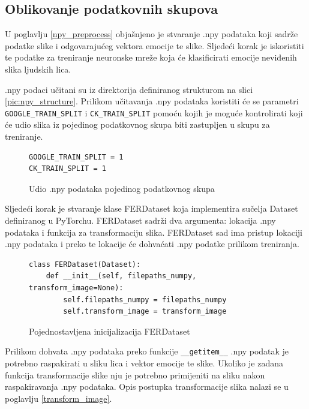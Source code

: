 \documentclass[times, utf8, zavrsni,numeric,pstricks]{fer}
\begin{document}
\subsection{Oblikovanje podatkovnih skupova}
U poglavlju \ref{npy_preprocess} objašnjeno je stvaranje .npy podataka koji sadrže podatke slike i odgovarajućeg vektora emocije te slike. Sljedeći korak je iskoristiti te podatke za treniranje neuronske mreže koja će klasificirati emocije neviđenih slika ljudskih lica.

.npy podaci učitani su iz direktorija definiranog strukturom na slici \ref{pic:npy_structure}. Prilikom učitavanja .npy podataka koristiti će se parametri \lstinline"GOOGLE_TRAIN_SPLIT" i \lstinline"CK_TRAIN_SPLIT" pomoću kojih je moguće kontrolirati koji će udio slika iz pojedinog podatkovnog skupa biti zastupljen u skupu za treniranje.

\begin{figure}[H]
\centering
\begin{Verbatim}[fontsize=\small]
GOOGLE_TRAIN_SPLIT = 1
CK_TRAIN_SPLIT = 1
\end{Verbatim}
\caption{Udio .npy podataka pojedinog podatkovnog skupa}
\label{pic:split_dataset}
\end{figure}
\noindent
Sljedeći korak je stvaranje klase FERDataset  koja implementira sučelja Dataset definiranog u PyTorchu. FERDataset sadrži dva argumenta: lokacija .npy podataka i funkcija za transformaciju slika. FERDataset sad ima pristup lokaciji .npy podataka i preko te lokacije će dohvaćati .npy podatke prilikom treniranja.
\begin{figure}[H]
\centering

\begin{Verbatim}[fontsize=\small]
class FERDataset(Dataset):
    def __init__(self, filepaths_numpy, transform_image=None):
        self.filepaths_numpy = filepaths_numpy
        self.transform_image = transform_image
\end{Verbatim}
\caption{Pojednostavljena inicijalizacija FERDataset}
\label{pic:init_dataset}

\end{figure}
\noindent
Prilikom dohvata .npy podataka preko funkcije \lstinline"__getitem__" .npy podatak je potrebno raspakirati u sliku lica i vektor emocije te slike. Ukoliko je zadana funkcija transformacije slike nju je potrebno primijeniti na sliku nakon raspakiravanja .npy podataka. Opis postupka transformacije slika nalazi se u poglavlju \ref{transform_image}. 
\end{document}
